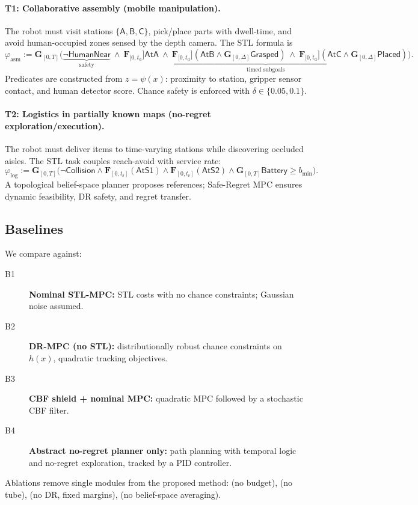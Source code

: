 \documentclass[journal]{IEEEtran}
\theoremstyle{definition}
\begin{document}
\paragraph*{T1: Collaborative assembly (mobile manipulation).}
The robot must visit stations $\{\mathsf{A},\mathsf{B},\mathsf{C}\}$, pick/place parts with dwell-time,
and avoid human-occupied zones sensed by the depth camera. The STL formula is
\[
\varphi_{\mathrm{asm}} :=
\mathbf{G}_{[0,T]}
\Big(\underbrace{\neg\mathsf{HumanNear}}_{\text{safety}}\ \wedge\
\underbrace{\mathbf{F}_{[0,t_\mathrm{d}}]\mathsf{AtA}\ \wedge\
\mathbf{F}_{[0,t_\mathrm{d}}](\mathsf{AtB}\wedge \mathbf{G}_{[0,\Delta]} \mathsf{Grasped})\ \wedge\
\mathbf{F}_{[0,t_\mathrm{d}}](\mathsf{AtC}\wedge \mathbf{G}_{[0,\Delta]} \mathsf{Placed})}_{\text{timed subgoals}}\Big).
\]
Predicates are constructed from $z=\psi(x)$: proximity to station, gripper sensor contact, and human detector score.
Chance safety is enforced with $\delta\in\{0.05,0.1\}$.

\paragraph*{T2: Logistics in partially known maps (no-regret exploration/execution).}
The robot must deliver items to time-varying stations while discovering occluded aisles.
The STL task couples reach-avoid with service rate:
\[
\varphi_{\mathrm{log}} :=
\mathbf{G}_{[0,T]}
\big(\neg\mathsf{Collision} \wedge
\mathbf{F}_{[0,t_\mathrm{s}]}(\mathsf{AtS1}) \wedge
\mathbf{F}_{[0,t_\mathrm{s}]}(\mathsf{AtS2}) \wedge
\mathbf{G}_{[0,T]}\mathsf{Battery}\ge b_{\min}\big).
\]
A topological belief-space planner proposes references; Safe-Regret MPC ensures dynamic feasibility,
DR safety, and regret transfer.

\subsection{Baselines}
We compare against:
\begin{description}
\item[B1] \textbf{Nominal STL-MPC:} STL costs with no chance constraints; Gaussian noise assumed.
\item[B2] \textbf{DR-MPC (no STL):} distributionally robust chance constraints on $h(x)$, quadratic tracking objectives.
\item[B3] \textbf{CBF shield + nominal MPC:} quadratic MPC followed by a stochastic CBF filter.
\item[B4] \textbf{Abstract no-regret planner only:} path planning with temporal logic and no-regret exploration, tracked by a PID controller.
\end{description}
Ablations remove single modules from the proposed method:
(no budget), (no tube), (no DR, fixed margins), (no belief-space averaging).
\end{document}
